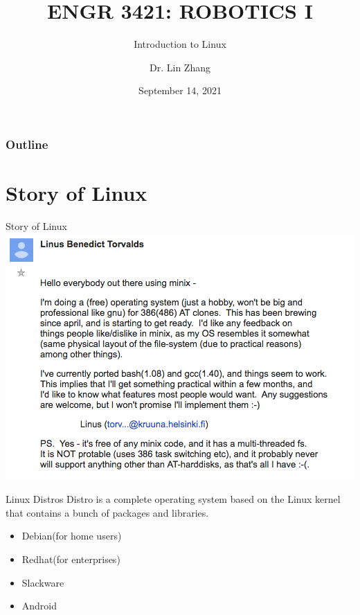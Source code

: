 \documentclass[12pt,letterpaper]{beamer}
\title[Robotics I]
{ENGR 3421: ROBOTICS I}
\subtitle{Introduction to Linux}
\author[Zhang, Lin]
{Dr. Lin Zhang}
\institute[UCA] %
{
  Department of Physics and Astronomy\\
  University of Central Arkansas
}
\date[Robotics1 2021] %
{September 14, 2021}
\begin{document}
\frame{\titlepage}

\begin{frame}
\frametitle{Outline}
\tableofcontents
\end{frame}

\section{Story of Linux}

\begin{frame}{Story of Linux}
    {\centering
        \includegraphics[width=0.8\linewidth]{linus_torvald_first_linux_email}
    }
\end{frame}

\begin{frame}{Linux Distros}
    Distro is a complete operating system based on the Linux kernel that contains a bunch of packages and libraries.
    \begin{itemize} 
        \item Debian(for home users)
        \item Redhat(for enterprises)
        \item Slackware
        \item Android
    \end{itemize} 
\end{frame}
\end{document}
